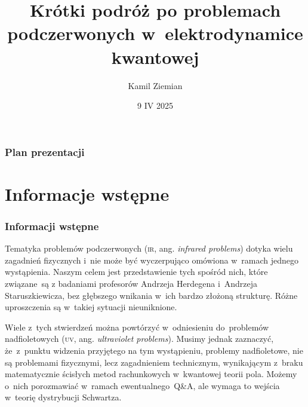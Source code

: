 \documentclass[10pt,t]{beamer}
\title{Krótki podróż po problemach podczerwonych
  w~elektrodynamice kwantowej}
\author{Kamil Ziemian \\
  \email}
\date[9 IV 2025]{9 IV 2025}
\begin{document}





\RaggedRight





\maketitle





\begin{frame}
  \frametitle{Plan prezentacji}


  \tableofcontents

\end{frame}










\section{Informacje wstępne}


\begin{frame}
  \frametitle{Informacji wstępne}


  Tematyka problemów podczerwonych (\textsc{ir}, ang. \textit{infrared
    problems}) dotyka wielu zagadnień fizycznych i~nie może być
  wyczerpująco omówiona w~ramach jednego wystąpienia. Naszym
  celem jest przedstawienie tych spośród nich, które związane~są z
  badaniami profesorów Andrzeja Herdegena i~Andrzeja Staruszkiewicza, bez
  głębszego wnikania w~ich bardzo złożoną strukturę. Różne uproszczenia są
  w~takiej sytuacji nieuniknione.

  Wiele z~tych stwierdzeń można powtórzyć w~odniesieniu do~problemów
  nadfioletowych (\textsc{uv}, ang. \textit{ultraviolet problems}). Musimy
  jednak zaznaczyć, że~z~punktu widzenia przyjętego na tym wystąpieniu,
  problemy nadfioletowe, \alert{nie} są problemami fizycznymi, lecz
  zagadnieniem technicznym, wynikającym z~braku matematycznie ścisłych metod
  rachunkowych w~kwantowej teorii pola. Możemy o~nich porozmawiać
  w~ramach ewentualnego~Q\&A, ale wymaga to wejścia w~teorię dystrybucji
  Schwartza.


\end{frame}
\end{document}
